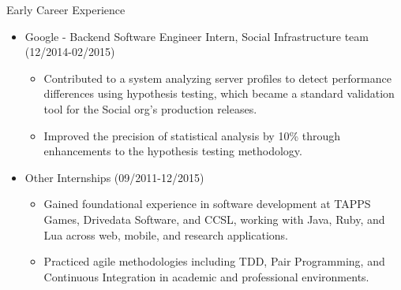 
\normalsize{Early Career Experience}
\begin{itemize}
    \item \footnotesize{Google - Backend Software Engineer Intern, Social Infrastructure team (12/2014-02/2015)}
    \begin{itemize}
        \item \scriptsize{Contributed to a system analyzing server profiles to detect performance differences using hypothesis testing, which became a standard validation tool for the Social org's production releases.}
        \item \scriptsize{Improved the precision of statistical analysis by 10\% through enhancements to the hypothesis testing methodology.}
    \end{itemize}

    \item \footnotesize{Other Internships (09/2011-12/2015)}
    \begin{itemize}
        \item \scriptsize{Gained foundational experience in software development at TAPPS Games, Drivedata Software, and CCSL, working with Java, Ruby, and Lua across web, mobile, and research applications.}
        \item \scriptsize{Practiced agile methodologies including TDD, Pair Programming, and Continuous Integration in academic and professional environments.}
    \end{itemize}
\end{itemize}